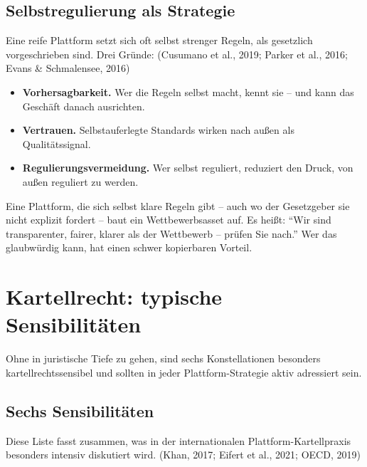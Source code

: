 \documentclass[11pt,a4paper,oneside]{article}
\newcommand{\quelle}[1]{{\footnotesize\color{lpGray}(#1)}}
\begin{document}
\subsection{Selbstregulierung als Strategie}

Eine reife Plattform setzt sich oft selbst strenger Regeln, als gesetzlich vorgeschrieben sind. Drei Gründe: \quelle{Cusumano et al., 2019; Parker et al., 2016; Evans \& Schmalensee, 2016}

\begin{itemize}
  \item \textbf{Vorhersagbarkeit.} Wer die Regeln selbst macht, kennt sie -- und kann das Geschäft danach ausrichten.
  \item \textbf{Vertrauen.} Selbstauferlegte Standards wirken nach außen als Qualitätssignal.
  \item \textbf{Regulierungsvermeidung.} Wer selbst reguliert, reduziert den Druck, von außen reguliert zu werden.
\end{itemize}

\begin{merkbox}
Eine Plattform, die sich selbst klare Regeln gibt -- auch wo der Gesetzgeber sie nicht explizit fordert -- baut ein Wettbewerbsasset auf. Es heißt: ``Wir sind transparenter, fairer, klarer als der Wettbewerb -- prüfen Sie nach.'' Wer das glaubwürdig kann, hat einen schwer kopierbaren Vorteil.
\end{merkbox}

\section{Kartellrecht: typische Sensibilitäten}

Ohne in juristische Tiefe zu gehen, sind sechs Konstellationen besonders kartellrechtssensibel und sollten in jeder Plattform-Strategie aktiv adressiert sein.

\subsection{Sechs Sensibilitäten}

Diese Liste fasst zusammen, was in der internationalen Plattform-Kartellpraxis besonders intensiv diskutiert wird. \quelle{Khan, 2017; Eifert et al., 2021; OECD, 2019}
\end{document}
